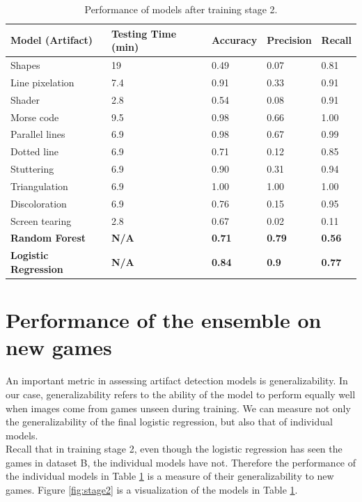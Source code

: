 \begin{table}
\centering
\begin{tabular}{@{}lllll@{}}
\toprule
Model (Artifact) & Testing Time (min) & Accuracy & Precision & Recall  \\ \midrule
Shapes & 19 & 0.49 & 0.07 & 0.81\\
Line pixelation & 7.4 & 0.91 & 0.33 & 0.91\\
Shader & 2.8 & 0.54 & 0.08 & 0.91\\
Morse code & 9.5 & 0.98 & 0.66 & 1.00\\
Parallel lines & 6.9 & 0.98 & 0.67 & 0.99\\
Dotted line & 6.9 & 0.71 & 0.12 & 0.85\\
Stuttering & 6.9 & 0.90 & 0.31 & 0.94\\
Triangulation & 6.9 & 1.00 & 1.00 & 1.00\\
Discoloration & 6.9 & 0.76 & 0.15 & 0.95\\
Screen tearing & 2.8 & 0.67 & 0.02 & 0.11\\
\midrule
\bf{Random Forest} & \bf{N/A} & \bf{0.71} & \bf{0.79} & \bf{0.56}\\
\bf{Logistic Regression} & \bf{N/A} & \bf{0.84} & \bf{0.9} & \bf{0.77}\\\bottomrule
\end{tabular}
\caption{Performance of models after training stage 2.}
\label{tab:stage2}
\end{table}

\section{Performance of the ensemble on new games}
\noindent An important metric in assessing artifact detection models is generalizability. In our case, generalizability refers to the ability of the model to perform equally well when images come from games unseen during training. We can measure not only the generalizability of the final logistic regression, but also that of individual models. \\

\noindent
Recall that in training stage 2, even though the logistic regression has seen the games in dataset B, the individual models have not. Therefore the performance of the individual models in Table \ref{tab:stage2} is a measure of their generalizability to new games. Figure \ref{fig:stage2} is a visualization of the models in Table \ref{tab:stage2}. \\
 

